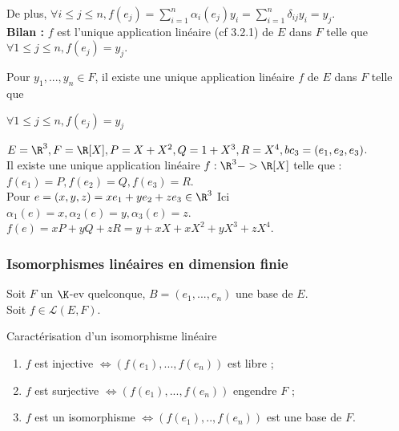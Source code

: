 \documentclass[12pt, a4paper]{report}
\begin{document}
De plus, $\forall i \le j \le n, f(e_j) = \displaystyle{\sum_{i=1}^n\alpha_i(e_j)y_i} = \displaystyle{\sum_{i=1}^n \delta_{ij}y_i} = y_j$. \\

\textbf{Bilan :} $f$ est l'unique application linéaire (cf 3.2.1) de $E$ dans $F$ telle que $\forall 1 \le j \le n, f(e_j) = y_j$.

\begin{theoreme}{}{}
Pour $y_1,...,y_n \in F$, il existe une unique application linéaire $f$ de $E$ dans $F$ telle que 
\begin{center}
$\forall 1 \le j \le n, f(e_j) = y_j$
\end{center}
\end{theoreme}

\begin{exemple}{}
$E = \R^3, F = \R[X], P = X+X^2, Q = 1+X^3,R=X^4, bc_3 = (e_1,e_2,e_3)$. \\
Il existe une unique application linéaire $f : \R^3 -> \R[X]$ telle que : \\
$f(e_1) = P, f(e_2) = Q, f(e_3) = R$. \\

Pour $e = (x,y,z) = xe_1+ye_2+ze_3 \in \R^3$
Ici $\alpha_1(e) = x, \alpha_2(e) = y, \alpha_3(e) = z$. \\
$f(e) = xP+yQ+zR = y+xX+xX^2+yX^3+zX^4$.
\end{exemple}

\subsubsection{Isomorphismes linéaires en dimension finie}

Soit $F$ un $\K$-ev quelconque, $B = (e_1,...,e_n)$ une base de $E$. \\
Soit $f \in \mathcal{L}(E,F)$.

\begin{theoreme}{Caractérisation d'un isomorphisme linéaire}{}
\begin{enumerate}
	\item $f$ est injective $\Longleftrightarrow (f(e_1),...,f(e_n))$ est libre ;
	\item $f$ est surjective $\Longleftrightarrow (f(e_1),...,f(e_n))$ engendre $F$ ;
	\item $f$ est un isomorphisme $\Longleftrightarrow (f(e_1),..,f(e_n))$ est une base de $F$.
\end{enumerate}
\end{theoreme}
\end{document}
